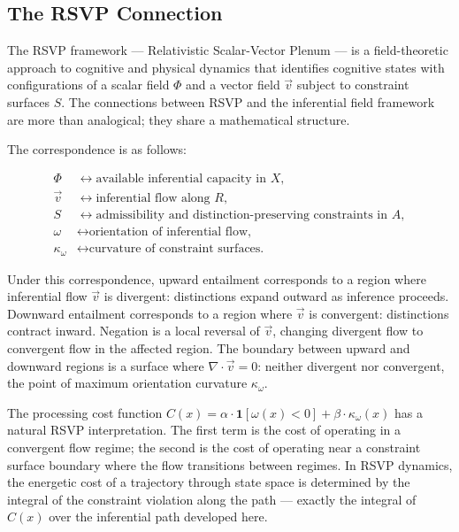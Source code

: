 \documentclass[12pt]{article}
\theoremstyle{remark}
\begin{document}
\subsection{The RSVP Connection}

The RSVP framework --- Relativistic Scalar-Vector Plenum --- is a
field-theoretic approach to cognitive and physical dynamics that
identifies cognitive states with configurations of a scalar field $\Phi$
and a vector field $\vec{v}$ subject to constraint surfaces $S$. The
connections between RSVP and the inferential field framework are more
than analogical; they share a mathematical structure.

The correspondence is as follows:

\begin{align*}
\Phi &\longleftrightarrow \text{available inferential capacity in } X,\\
\vec{v} &\longleftrightarrow \text{inferential flow along } R,\\
S &\longleftrightarrow \text{admissibility and distinction-preserving
constraints in } A,\\
\omega &\longleftrightarrow \text{orientation of inferential flow,}\\
\kappa_\omega &\longleftrightarrow \text{curvature of constraint
surfaces.}
\end{align*}

Under this correspondence, upward entailment corresponds to a region
where inferential flow $\vec{v}$ is divergent: distinctions expand
outward as inference proceeds. Downward entailment corresponds to a
region where $\vec{v}$ is convergent: distinctions contract inward.
Negation is a local reversal of $\vec{v}$, changing divergent flow to
convergent flow in the affected region. The boundary between upward and
downward regions is a surface where $\nabla \cdot \vec{v} = 0$: neither
divergent nor convergent, the point of maximum orientation curvature
$\kappa_\omega$.

The processing cost function $C(x) = \alpha \cdot \mathbf{1}[\omega(x)
< 0] + \beta \cdot \kappa_\omega(x)$ has a natural RSVP interpretation.
The first term is the cost of operating in a convergent flow regime; the
second is the cost of operating near a constraint surface boundary where
the flow transitions between regimes. In RSVP dynamics, the energetic
cost of a trajectory through state space is determined by the integral
of the constraint violation along the path --- exactly the integral of
$C(x)$ over the inferential path developed here.
\end{document}
